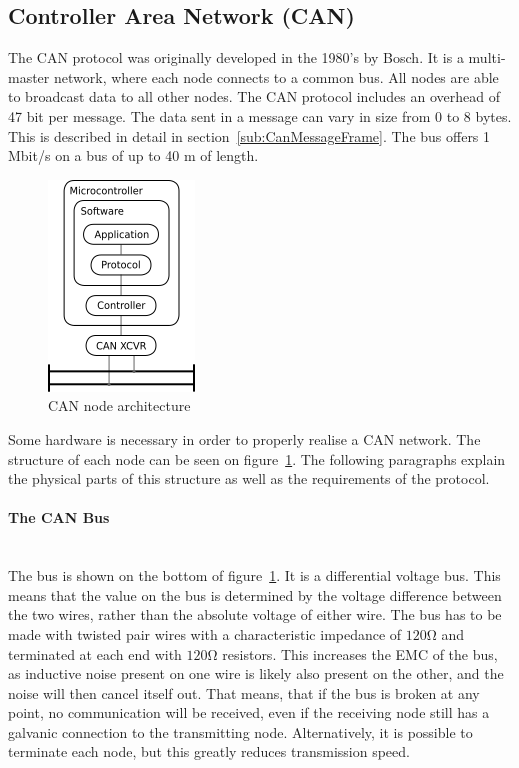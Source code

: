 
\subsection{Controller Area Network (CAN)}\label{sec:CAN-bus}
The CAN protocol was originally developed in the 1980's by Bosch.
It is a multi-master network, where each node connects to a common bus.
All nodes are able to broadcast data to all other nodes.
The CAN protocol includes an overhead of 47 bit per message.
The data sent in a message can vary in size from 0 to 8 bytes.
This is described in detail in section~\ref{sub:CanMessageFrame}.
The bus offers 1 Mbit/s on a bus of up to 40 \si{\metre} of length.

\begin{figure}[h!]
	\centering
	\includegraphics{graphics/canbus_setup}
	\caption{CAN node architecture}
	\label{fig:canbus_setup}
\end{figure}

Some hardware is necessary in order to properly realise a CAN network.
The structure of each node can be seen on figure~\ref{fig:canbus_setup}.
The following paragraphs explain the physical parts of this structure as well as the requirements of the protocol.

\paragraph*{The CAN Bus}~\\
The bus is shown on the bottom of figure~\ref{fig:canbus_setup}.
It is a differential voltage bus.
This means that the value on the bus is determined by the voltage difference between the two wires, rather than the absolute voltage of either wire.
The bus has to be made with twisted pair wires with a characteristic impedance of $\si{120 \ohm}$ and terminated at each end with $\si{120 \ohm}$ resistors.
This increases the EMC of the bus, as inductive noise present on one wire is likely also present on the other, and the noise will then cancel itself out.
That means, that if the bus is broken at any point, no communication will be received, even if the receiving node still has a galvanic connection to the transmitting node.
Alternatively, it is possible to terminate each node, but this greatly reduces transmission speed.\\

